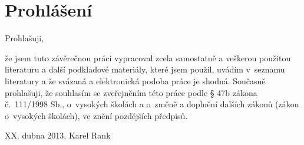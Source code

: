 \section*{Prohlášení}
Prohlašuji,

že jsem tuto závěrečnou práci vypracoval zcela samostatně a veškerou použitou literaturu a další podkladové materiály, které jsem použil, uvádím v~seznamu literatury a že svázaná a elektronická podoba práce je shodná. Současně prohlašuji, že souhlasím se zveřejněním této práce podle § 47b zákona č.~111/1998 Sb., o~vysokých školách a o~změně a doplnění dalších zákonů (zákon o~vysokých školách), ve znění pozdějších předpisů.

\bigskip
\begin{flushright}
XX. dubna 2013, Karel Rank
\end{flushright}

\newpage
